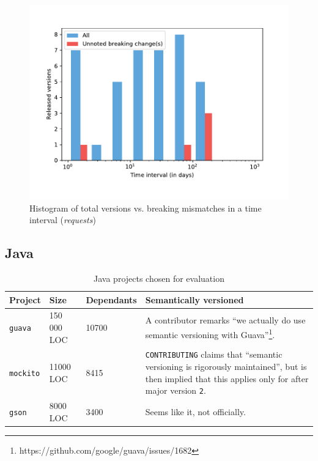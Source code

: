 \documentclass{l4proj}
\newcommand\genericstyle{\lstset{basicstyle=\ttm}}
\newcommand\codeinline[1]{{\genericstyle\lstinline!#1!}}
\begin{document}
\begin{figure}[]
\centering
\includegraphics[height=0.4\textheight]{images/evaluation/requests_introduced_changes}
\caption{Histogram of total versions vs. breaking mismatches in a time
interval (\textit{requests})}
\label{RequestsHistogram}
\end{figure}

\subsection{Java}

\begin{table}[H]
\label{JavaProjectsForEvaluation}
\centering
\begin{tabular}{|l|l|l|p{10cm}|}
\hline
\textbf{Project} & \textbf{Size} & \textbf{Dependants} & \textbf{Semantically versioned} \\
\hline
\codeinline{guava} & 150 000 LOC & 10700 & A contributor remarks ``we
actually do use semantic versioning with
Guava''\footnote{https://github.com/google/guava/issues/1682}. \\
\codeinline{mockito} & 11000 LOC & 8415 & \codeinline{CONTRIBUTING}
claims that ``semantic versioning is rigorously maintained'', but is
then implied that this applies only for after major version
\codeinline{2}. \\
\codeinline{gson} & 8000 LOC & 3400 & Seems like it, not officially. \\
\hline
\end{tabular}
\caption{Java projects chosen for evaluation}
\end{table}
\end{document}
